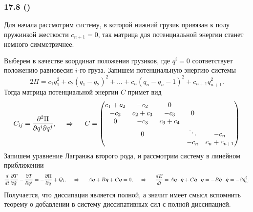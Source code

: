 \subsubsection*{17.8 (\checkmark)}

Для начала рассмотрим систему, в которой нижний грузик привязан к полу пружинкой жесткости $c_{n+1} = 0$, так матрица для потенциальной энергии станет немного симметричнее. 

Выберем в качестве координат положения грузиков, где $q^i = 0$ соответствует положению равновесия $i$-го груза.  
Запишем потенциальную энергию системы
\begin{equation*}
    2 \Pi = c_1 q_1^2 + c_2(q_1-q_2)^2 + \ldots + c_n (q_n-q_n-1)^2 + c_{n+1} q_{n+1}^2.
\end{equation*}
Тогда матрица потенциальной энергии $C$ примет вид
\begin{equation*}
    C_{ij} = \frac{\partial^2 \Pi}{\partial q^i \partial q^j},
    \hspace{0.5cm} \Rightarrow \hspace{0.5cm}
    C = \begin{pmatrix}
        c_1 + c_2 & -c_2 & 0 &  &  \\
        -c_2 & c_2 + c_3 & -c_3 & 0 &  \\
        0 & -c_3 & c_3 + c_4 &  &   \\
         & 0 &  & \ddots & -c_n \\
         &  &  & -c_n & c_n + c_{n+1}
    \end{pmatrix}
\end{equation*}
Запишем уравнение Лагранжа второго рода, и рассмотрим систему в линейном приближении
\begin{equation*}
    \frac{d }{d t} \frac{\partial T}{\partial \dot{q}^i} - \frac{\partial T}{\partial q^i}
     = - \frac{\partial \Pi}{\partial q} + Q_i,
     \hspace{0.5cm} \Rightarrow \hspace{0.5cm}
     A \ddot{\mbox{\boldmath $q$}} + B \dot{\mbox{\boldmath $q$}} + C \mbox{\boldmath $q$} = 0,
     \hspace{0.5cm} \Rightarrow \hspace{0.5cm}
     \frac{d E}{d t} =
     A \ddot{\mbox{\boldmath $q$}} \cdot \dot{\mbox{\boldmath $q$}} + C \dot{\mbox{\boldmath $q$}} \cdot \mbox{\boldmath $q$} = - B \dot{\mbox{\boldmath $q$}} \cdot \dot{\mbox{\boldmath $q$}} = - \beta \dot{q}_n^2.
\end{equation*}
Получается, что диссипация является полной, а значит имеет смысл вспомнить теорему о добавлении в систему диссипативных сил с полной диссипацией.

